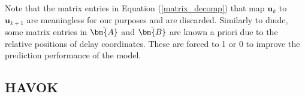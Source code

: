     Note that the matrix entries in Equation (\ref{matrix_decomp}) that map $\bm{u}_k$ to $\bm{u}_{k+1}$ are meaningless for our purposes and are discarded.
    Similarly to \gls{dmdc}, some matrix entries in $\Tilde{\bm{A}}$ and $\Tilde{\bm{B}}$ are known a priori due to the relative positions of delay coordinates. These are forced to 1 or 0 to improve the prediction performance of the model.

    \subsection{HAVOK}


